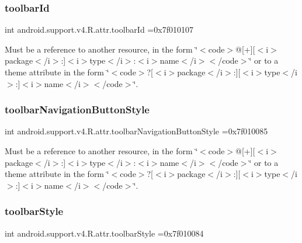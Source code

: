 \subsubsection{\texorpdfstring{toolbar\+Id}{toolbarId}}
{\footnotesize\ttfamily int android.\+support.\+v4.\+R.\+attr.\+toolbar\+Id =0x7f010107\hspace{0.3cm}{\ttfamily [static]}}

Must be a reference to another resource, in the form \char`\"{}$<$code$>$@\mbox{[}+\mbox{]}\mbox{[}$<$i$>$package$<$/i$>$\+:\mbox{]}$<$i$>$type$<$/i$>$\+:$<$i$>$name$<$/i$>$$<$/code$>$\char`\"{} or to a theme attribute in the form \char`\"{}$<$code$>$?\mbox{[}$<$i$>$package$<$/i$>$\+:\mbox{]}\mbox{[}$<$i$>$type$<$/i$>$\+:\mbox{]}$<$i$>$name$<$/i$>$$<$/code$>$\char`\"{}. \mbox{\label{classandroid_1_1support_1_1v4_1_1R_1_1attr_a930882aabfb34152191aea6412ffe683}} 
\subsubsection{\texorpdfstring{toolbar\+Navigation\+Button\+Style}{toolbarNavigationButtonStyle}}
{\footnotesize\ttfamily int android.\+support.\+v4.\+R.\+attr.\+toolbar\+Navigation\+Button\+Style =0x7f010085\hspace{0.3cm}{\ttfamily [static]}}

Must be a reference to another resource, in the form \char`\"{}$<$code$>$@\mbox{[}+\mbox{]}\mbox{[}$<$i$>$package$<$/i$>$\+:\mbox{]}$<$i$>$type$<$/i$>$\+:$<$i$>$name$<$/i$>$$<$/code$>$\char`\"{} or to a theme attribute in the form \char`\"{}$<$code$>$?\mbox{[}$<$i$>$package$<$/i$>$\+:\mbox{]}\mbox{[}$<$i$>$type$<$/i$>$\+:\mbox{]}$<$i$>$name$<$/i$>$$<$/code$>$\char`\"{}. \mbox{\label{classandroid_1_1support_1_1v4_1_1R_1_1attr_ab78bc91d2584ed157ab4c6f941adc567}} 
\subsubsection{\texorpdfstring{toolbar\+Style}{toolbarStyle}}
{\footnotesize\ttfamily int android.\+support.\+v4.\+R.\+attr.\+toolbar\+Style =0x7f010084\hspace{0.3cm}{\ttfamily [static]}}

